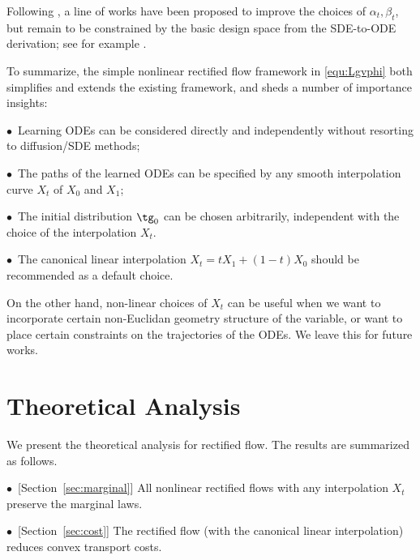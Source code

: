 \documentclass[11pt]{article}
\begin{document}
Following \cite{song2020score, ho2020denoising}, a line of works have been proposed to improve the choices of $\alpha_t,\beta_t$, 
but remain to be constrained 
by the basic design space from the SDE-to-ODE derivation; see for example \cite{nichol2021improved, elucidating, zhang2022gddim}. 




To summarize, the simple nonlinear rectified flow framework in \eqref{equ:Lgvphi} 
both simplifies and extends the existing framework, and sheds a number of importance insights: %

$\bullet$~Learning ODEs can be considered directly and independently without resorting to diffusion/SDE methods; 

$\bullet$~The paths of the learned ODEs can be specified by any smooth interpolation curve $X_t$ of $X_0$ and $X_1$;  

$\bullet$~The initial distribution $\tg_0$ can be chosen arbitrarily, 
independent with the choice of 
the interpolation 
$X_t$.  

 $\bullet$~The canonical linear interpolation  $X_t = t X_1 + (1-t) X_0$ should be recommended as a default choice. 
 
On the other hand, non-linear choices of $X_t$ can be useful %
when we want to incorporate certain non-Euclidan geometry structure of the variable, 
or want to place certain constraints on the  trajectories of the ODEs.  
We leave this for future works. 
 













 




 
 


\section{Theoretical Analysis} 
\label{sec:theory}
We present the theoretical analysis for rectified flow. The results are summarized as follows. 


$\bullet$~[Section~\ref{sec:marginal}] %
All nonlinear rectified flows with any interpolation $X_t$ preserve the marginal laws.  

$\bullet$~[Section~\ref{sec:cost}] The rectified flow (with the canonical linear interpolation) reduces convex transport costs.  %
\end{document}
